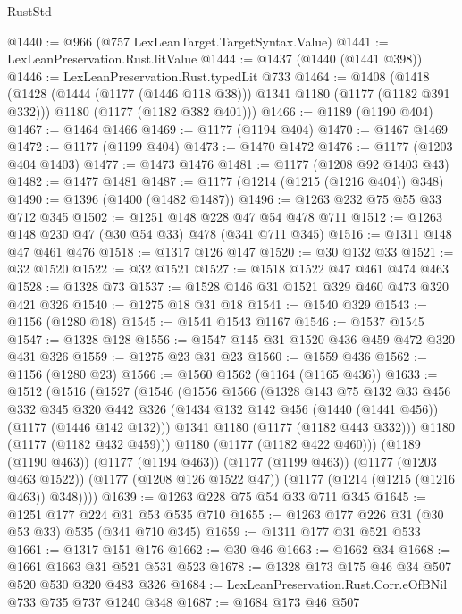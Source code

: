 \begin{lexlean}{RustStd}
\begin{coremodule}
@1440 := @966 (@757 LexLeanTarget.TargetSyntax.Value)
@1441 := LexLeanPreservation.Rust.litValue
@1444 := @1437 (@1440 (@1441 @398))
@1446 := LexLeanPreservation.Rust.typedLit @733
@1464 := @1408
    (@1418
      (@1428 (@1444 (@1177 (@1446 @118 @38))) @1341 @1180 (@1177 (@1182 @391 @332)))
      @1180
      (@1177 (@1182 @382 @401)))
@1466 := @1189 (@1190 @404)
@1467 := @1464 @1466
@1469 := @1177 (@1194 @404)
@1470 := @1467 @1469
@1472 := @1177 (@1199 @404)
@1473 := @1470 @1472
@1476 := @1177 (@1203 @404 @1403)
@1477 := @1473 @1476
@1481 := @1177 (@1208 @92 @1403 @43)
@1482 := @1477 @1481
@1487 := @1177 (@1214 (@1215 (@1216 @404)) @348)
@1490 := @1396 (@1400 (@1482 @1487))
@1496 := @1263 @232 @75 @55 @33 @712 @345
@1502 := @1251 @148 @228 @47 @54 @478 @711
@1512 := @1263 @148 @230 @47 (@30 @54 @33) @478 (@341 @711 @345)
@1516 := @1311 @148 @47 @461 @476
@1518 := @1317 @126 @147
@1520 := @30 @132 @33
@1521 := @32 @1520
@1522 := @32 @1521
@1527 := @1518 @1522 @47 @461 @474 @463
@1528 := @1328 @73
@1537 := @1528 @146 @31 @1521 @329 @460 @473 @320 @421 @326
@1540 := @1275 @18 @31 @18
@1541 := @1540 @329
@1543 := @1156 (@1280 @18)
@1545 := @1541 @1543 @1167
@1546 := @1537 @1545
@1547 := @1328 @128
@1556 := @1547 @145 @31 @1520 @436 @459 @472 @320 @431 @326
@1559 := @1275 @23 @31 @23
@1560 := @1559 @436
@1562 := @1156 (@1280 @23)
@1566 := @1560 @1562 (@1164 (@1165 @436))
@1633 := @1512
    (@1516
      (@1527
        (@1546
          (@1556
            @1566
            (@1328
              @143
              @75
              @132
              @33
              @456
              @332
              @345
              @320
              @442
              @326
              (@1434 @132 @142 @456 (@1440 (@1441 @456)) (@1177 (@1446 @142 @132)))
              @1341
              @1180
              (@1177 (@1182 @443 @332)))
            @1180
            (@1177 (@1182 @432 @459)))
          @1180
          (@1177 (@1182 @422 @460)))
        (@1189 (@1190 @463))
        (@1177 (@1194 @463))
        (@1177 (@1199 @463))
        (@1177 (@1203 @463 @1522))
        (@1177 (@1208 @126 @1522 @47))
        (@1177 (@1214 (@1215 (@1216 @463)) @348))))
@1639 := @1263 @228 @75 @54 @33 @711 @345
@1645 := @1251 @177 @224 @31 @53 @535 @710
@1655 := @1263 @177 @226 @31 (@30 @53 @33) @535 (@341 @710 @345)
@1659 := @1311 @177 @31 @521 @533
@1661 := @1317 @151 @176
@1662 := @30 @46
@1663 := @1662 @34
@1668 := @1661 @1663 @31 @521 @531 @523
@1678 := @1328 @173 @175 @46 @34 @507 @520 @530 @320 @483 @326
@1684 := LexLeanPreservation.Rust.Corr.eOfBNil @733 @735 @737 @1240 @348
@1687 := @1684 @173 @46 @507

\end{coremodule}
\end{lexlean}
